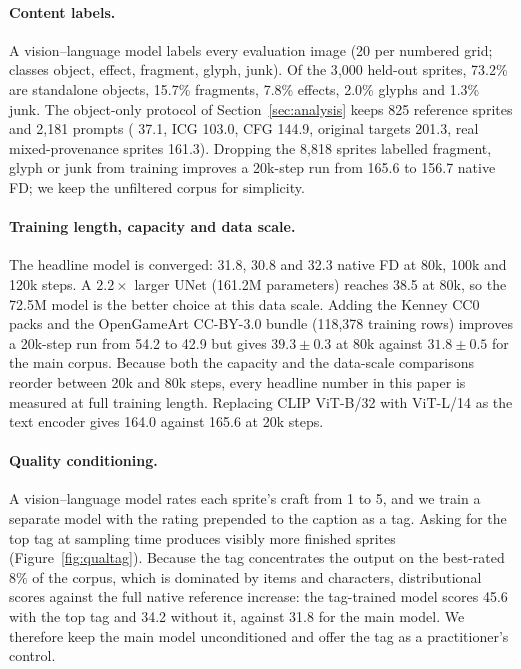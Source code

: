 \paragraph{Content labels.}
A vision--language model labels every evaluation image (20 per numbered grid; classes object, effect, fragment, glyph,
junk). Of the 3{,}000 held-out sprites, 73.2\% are standalone objects, 15.7\% fragments, 7.8\% effects, 2.0\% glyphs and
1.3\% junk. The object-only protocol of Section~\ref{sec:analysis} keeps 825 reference sprites and 2{,}181 prompts
(\ours{} 37.1, ICG 103.0, CFG 144.9, original targets 201.3, real mixed-provenance sprites 161.3). Dropping the 8{,}818
sprites labelled fragment, glyph or junk from training improves a 20k-step run from 165.6 to 156.7 native FD; we keep
the unfiltered corpus for simplicity.

\paragraph{Training length, capacity and data scale.}
The headline model is converged: 31.8, 30.8 and 32.3 native FD at 80k, 100k and 120k steps. A $2.2\times$ larger UNet
(161.2M parameters) reaches 38.5 at 80k, so the 72.5M model is the better choice at this data scale. Adding the Kenney
CC0 packs and the OpenGameArt CC-BY-3.0 bundle (118{,}378 training rows) improves a 20k-step run from 54.2 to 42.9 but
gives $39.3\pm0.3$ at 80k against $31.8\pm0.5$ for the main corpus. Because both the capacity and the data-scale
comparisons reorder between 20k and 80k steps, every headline number in this paper is measured at full training length.
Replacing CLIP ViT-B/32 with ViT-L/14 as the text encoder gives 164.0 against 165.6 at 20k steps.

\paragraph{Quality conditioning.}
A vision--language model rates each sprite's craft from 1 to 5, and we train a separate model with the rating prepended
to the caption as a tag. Asking for the top tag at sampling time produces visibly more finished sprites
(Figure~\ref{fig:qualtag}). Because the tag concentrates the output on the best-rated 8\% of the corpus, which is
dominated by items and characters, distributional scores against the full native reference increase: the tag-trained
model scores 45.6 with the top tag and 34.2 without it, against 31.8 for the main model. We therefore keep the main model
unconditioned and offer the tag as a practitioner's control.

